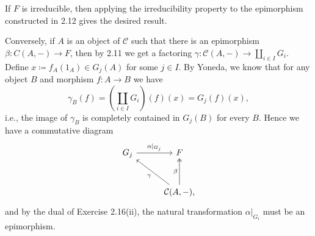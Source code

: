 If $F$ is irreducible, then applying the irreducibility property to the
epimorphism constructed in 2.12 gives the desired result.

Conversely, if $A$ is an object of $\mathcal{C}$ such that there is an
epimorphism $\beta\colon C(A, {-}) \to F$, then by 2.11 we get a factoring
$\gamma\colon \mathcal{C}(A, {-})\to \coprod_{i \in I}G_i$. Define
$x \coloneqq f_A(1_A) \in G_j(A)$ for some $j \in I$. By Yoneda, we know
that for any object $B$ and morphism $f\colon A\to B$ we have
\[ \gamma_B(f) = \left(\coprod_{i \in I}G_i\right)(f)(x) = G_j(f)(x), \]
i.e., the image of $\gamma_B$ is completely contained in $G_j(B)$ for every $B$.
Hence we have a commutative diagram
\[\begin{tikzcd}[row sep=1cm, column sep=1cm]
	G_j\ar[r, "\alpha|_{G_j}"] & F\\
	& \mathcal{C}(A, {-}),\ar[ul, "\gamma"]\ar[u, "\beta", two heads]
\end{tikzcd}\]
and by the dual of Exercise 2.16(ii), the natural transformation $\alpha|_{G_i}$
must be an epimorphism.
